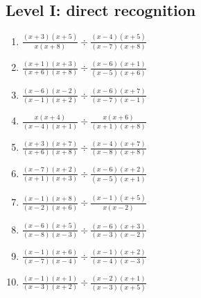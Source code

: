 \documentclass[11pt,oneside]{book}
\begin{document}
\subsection*{Level I: direct recognition}
\begin{enumerate}[leftmargin=*,label=\textbf{\arabic*.},itemsep=0.65\baselineskip]
\item $\displaystyle \frac{\left(x + 3\right) \left(x + 5\right)}{x \left(x + 8\right)}\div\frac{\left(x - 4\right) \left(x + 5\right)}{\left(x - 7\right) \left(x + 8\right)}$
\item $\displaystyle \frac{\left(x + 1\right) \left(x + 3\right)}{\left(x + 6\right) \left(x + 8\right)}\div\frac{\left(x - 6\right) \left(x + 1\right)}{\left(x - 5\right) \left(x + 6\right)}$
\item $\displaystyle \frac{\left(x - 6\right) \left(x - 2\right)}{\left(x - 1\right) \left(x + 2\right)}\div\frac{\left(x - 6\right) \left(x + 7\right)}{\left(x - 7\right) \left(x - 1\right)}$
\item $\displaystyle \frac{x \left(x + 4\right)}{\left(x - 4\right) \left(x + 1\right)}\div\frac{x \left(x + 6\right)}{\left(x + 1\right) \left(x + 8\right)}$
\item $\displaystyle \frac{\left(x + 3\right) \left(x + 7\right)}{\left(x + 6\right) \left(x + 8\right)}\div\frac{\left(x - 4\right) \left(x + 7\right)}{\left(x - 8\right) \left(x + 8\right)}$
\item $\displaystyle \frac{\left(x - 7\right) \left(x + 2\right)}{\left(x + 1\right) \left(x + 3\right)}\div\frac{\left(x - 6\right) \left(x + 2\right)}{\left(x - 5\right) \left(x + 1\right)}$
\item $\displaystyle \frac{\left(x - 1\right) \left(x + 8\right)}{\left(x - 2\right) \left(x + 6\right)}\div\frac{\left(x - 1\right) \left(x + 5\right)}{x \left(x - 2\right)}$
\item $\displaystyle \frac{\left(x - 6\right) \left(x + 5\right)}{\left(x - 8\right) \left(x - 3\right)}\div\frac{\left(x - 6\right) \left(x + 3\right)}{\left(x - 3\right) \left(x - 2\right)}$
\item $\displaystyle \frac{\left(x - 1\right) \left(x + 6\right)}{\left(x - 7\right) \left(x - 4\right)}\div\frac{\left(x - 1\right) \left(x + 2\right)}{\left(x - 4\right) \left(x - 3\right)}$
\item $\displaystyle \frac{\left(x - 1\right) \left(x + 1\right)}{\left(x - 3\right) \left(x + 2\right)}\div\frac{\left(x - 2\right) \left(x + 1\right)}{\left(x - 3\right) \left(x + 5\right)}$
\end{enumerate}
\end{document}
